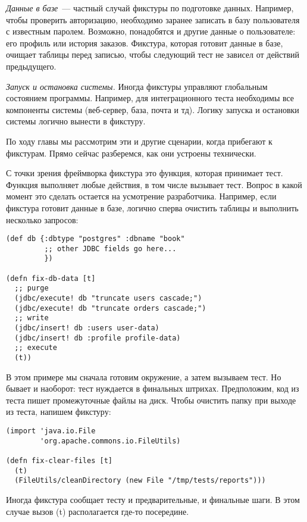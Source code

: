 \emph{Данные в базе}~--- частный случай фикстуры по подготовке данных. Например,
чтобы проверить авторизацию, необходимо заранее записать в базу пользователя с
известным паролем. Возможно, понадобятся и другие данные о пользователе: его
профиль или история заказов. Фикстура, которая готовит данные в базе, очищает
таблицы перед записью, чтобы следующий тест не зависел от действий предыдущего.

\emph{Запуск и остановка системы.} Иногда фикстуры управляют глобальным состоянием
программы. Например, для интеграционного теста необходимы все компоненты системы
(веб-сервер, база, почта и тд). Логику запуска и остановки системы логично
вынести в фикстуру.

По ходу главы мы рассмотрим эти и другие сценарии, когда прибегают к
фикстурам. Прямо сейчас разберемся, как они устроены технически.

С точки зрения фреймворка фикстура это функция, которая принимает тест. Функция
выполняет любые действия, в том числе вызывает тест. Вопрос в какой момент это
сделать остается на усмотрение разработчика. Например, если фикстура готовит
данные в базе, логично сперва очистить таблицы и выполнить несколько запросов:

\begin{verbatim}
(def db {:dbtype "postgres" :dbname "book"
         ;; other JDBC fields go here...
         })

(defn fix-db-data [t]
  ;; purge
  (jdbc/execute! db "truncate users cascade;")
  (jdbc/execute! db "truncate orders cascade;")
  ;; write
  (jdbc/insert! db :users user-data)
  (jdbc/insert! db :profile profile-data)
  ;; execute
  (t))
\end{verbatim}

В этом примере мы сначала готовим окружение, а затем вызываем тест. Но бывает и
наоборот: тест нуждается в финальных штрихах. Предположим, код из теста пишет
промежуточные файлы на диск. Чтобы очистить папку при выходе из теста, напишем
фикстуру:

\begin{verbatim}
(import 'java.io.File
        'org.apache.commons.io.FileUtils)

(defn fix-clear-files [t]
  (t)
  (FileUtils/cleanDirectory (new File "/tmp/tests/reports")))
\end{verbatim}

Иногда фикстура сообщает тесту и предварительные, и финальные шаги. В этом
случае вызов (t) располагается где-то посередине.

